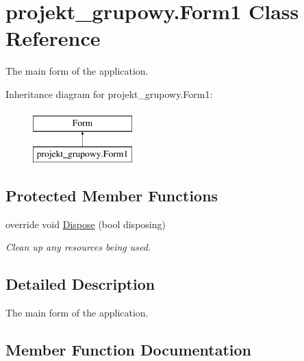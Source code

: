 \hypertarget{classprojekt__grupowy_1_1_form1}{}\section{projekt\+\_\+grupowy.\+Form1 Class Reference}
\label{classprojekt__grupowy_1_1_form1}


The main form of the application.  


Inheritance diagram for projekt\+\_\+grupowy.\+Form1\+:\begin{figure}[H]
\begin{center}
\leavevmode
\includegraphics[height=2.000000cm]{classprojekt__grupowy_1_1_form1}
\end{center}
\end{figure}
\subsection*{Protected Member Functions}
\begin{DoxyCompactItemize}
\item 
override void \hyperlink{classprojekt__grupowy_1_1_form1_a87f3ce54094d8d3c419685438b224c9d}{Dispose} (bool disposing)
\begin{DoxyCompactList}\small\item\em Clean up any resources being used. \end{DoxyCompactList}\end{DoxyCompactItemize}


\subsection{Detailed Description}
The main form of the application. 



\subsection{Member Function Documentation}
\mbox{\label{classprojekt__grupowy_1_1_form1_a87f3ce54094d8d3c419685438b224c9d}} 
